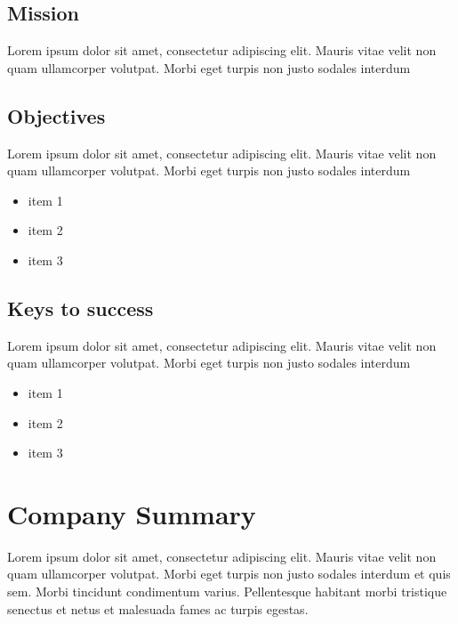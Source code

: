 \documentclass[11pt,titlepage]{article}
\begin{document}
\subsection{Mission}
Lorem ipsum dolor sit amet, consectetur adipiscing elit. Mauris vitae velit 
non quam ullamcorper volutpat. Morbi eget turpis non justo sodales interdum
\newline

\subsection{Objectives}
Lorem ipsum dolor sit amet, consectetur adipiscing elit. Mauris vitae velit 
non quam ullamcorper volutpat. Morbi eget turpis non justo sodales interdum
\newline
\begin{itemize}
\item item 1
\item item 2
\item item 3
\end{itemize}

\subsection{Keys to success}
Lorem ipsum dolor sit amet, consectetur adipiscing elit. Mauris vitae velit 
non quam ullamcorper volutpat. Morbi eget turpis non justo sodales interdum
\newline
\begin{itemize}
\item item 1
\item item 2
\item item 3
\end{itemize}

\section{Company Summary}
Lorem ipsum dolor sit amet, consectetur adipiscing elit. Mauris vitae velit 
non quam ullamcorper volutpat. Morbi eget turpis non justo sodales interdum 
et quis sem. Morbi tincidunt condimentum varius. Pellentesque habitant morbi 
tristique senectus et netus et malesuada fames ac turpis egestas.\newline
\end{document}
